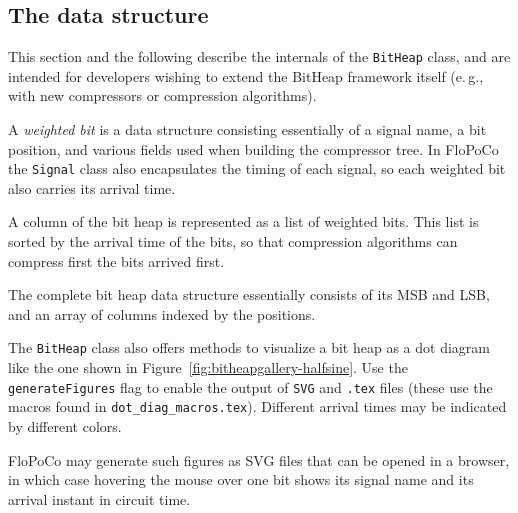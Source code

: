 \documentclass{article}
\begin{document}
\subsection{The data structure}
This section and the following describe the internals of the \texttt{BitHeap} class, and are intended for developers wishing to extend the BitHeap framework itself (e.\,g., with new compressors or compression algorithms).

A \emph{weighted bit} is a data structure consisting essentially of a signal name, a bit position, and various fields used when building the compressor tree.
In FloPoCo the \texttt{Signal} class also encapsulates the timing of each signal, so each weighted bit also carries its arrival time.


A column of the bit heap is represented as a list of weighted bits.
This list is  sorted by the  arrival time of the bits, so that compression algorithms can compress first the bits arrived first.

The complete bit heap data structure essentially consists of its MSB and LSB, and an array of columns indexed by the positions. 

The \texttt{BitHeap} class also offers methods to visualize a bit heap as a dot diagram like the one shown in Figure~\ref{fig:bitheapgallery-halfsine}.
Use the \texttt{generateFigures} flag to enable the output of \texttt{SVG} and \texttt{.tex} files (these use the macros found in \texttt{dot\_diag\_macros.tex}).
Different arrival times may be indicated by different colors.

FloPoCo may generate such figures as SVG files that can be opened in a browser, in which case hovering the mouse over one bit shows its signal name and its arrival instant in circuit time.  

\end{document}
